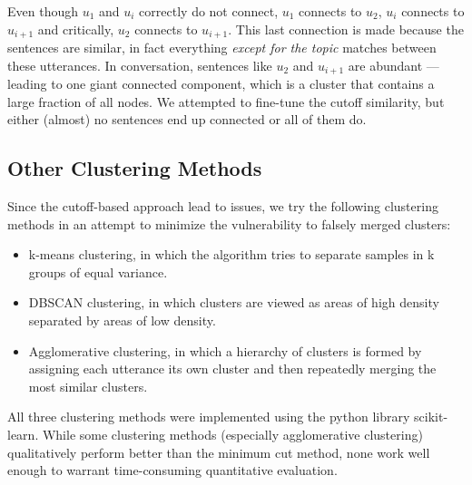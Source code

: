         Even though $u_1$ and $u_{i}$ correctly do not connect, $u_1$ connects to $u_2$, $u_{i}$ connects to $u_{i+1}$ and critically, $u_2$ connects to $u_{i+1}$. This last connection is made because the sentences are similar, in fact everything \textit{except for the topic} matches between these \glspl{utterance}. In conversation, sentences like $u_2$ and $u_{i+1}$ are abundant --- leading to one giant connected component, which is a cluster that contains a large fraction of all nodes. We attempted to fine-tune the cutoff similarity, but either (almost) no sentences end up connected or all of them do.


    \subsection{Other Clustering Methods}
        Since the cutoff-based approach lead to issues, we try the following clustering methods in an attempt to minimize the vulnerability to falsely merged clusters:
        \begin{itemize}
            \item k-means clustering, in which the algorithm tries to separate samples in k groups of equal variance.
            \item DBSCAN clustering, in which clusters are viewed as areas of high density separated by areas of low density.
            \item Agglomerative clustering, in which a hierarchy of clusters is formed by assigning each \gls{utterance} its own cluster and then repeatedly merging the most similar clusters.
        \end{itemize}
        All three clustering methods were implemented using the python library scikit-learn\cite{scikit-learn}. While some clustering methods (especially agglomerative clustering) qualitatively perform better than the minimum cut method, none work well enough to warrant time-consuming quantitative evaluation.



